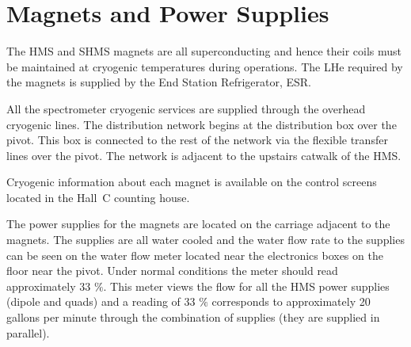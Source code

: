 %
%
%
%
%
%
%
%
%
%





\section{Magnets and Power Supplies}

The HMS and SHMS magnets are all
superconducting and hence their coils must be maintained at
cryogenic temperatures during operations. The LHe required by the magnets
is supplied by the End Station Refrigerator, ESR.

All the spectrometer cryogenic services are supplied through the overhead
cryogenic lines. The distribution network begins at the distribution
box over the pivot. This box is connected to the rest of the network via the
flexible transfer lines over the pivot. The network is adjacent to
the upstairs catwalk of the HMS.

Cryogenic information about each magnet is available on the control
screens located in the Hall~C counting house.

The power supplies for the magnets are located on the carriage
adjacent to the magnets. The supplies are all water cooled and
the water flow rate to the supplies can be seen on the water flow
meter located near the electronics boxes on the floor near the pivot.
Under normal conditions the meter should read
approximately 33 $\%$. This meter views the flow for all the HMS power supplies
(dipole and quads) and a reading of 33 $\%$ corresponds to approximately
20 gallons per minute through the combination of supplies (they are supplied
in parallel).

